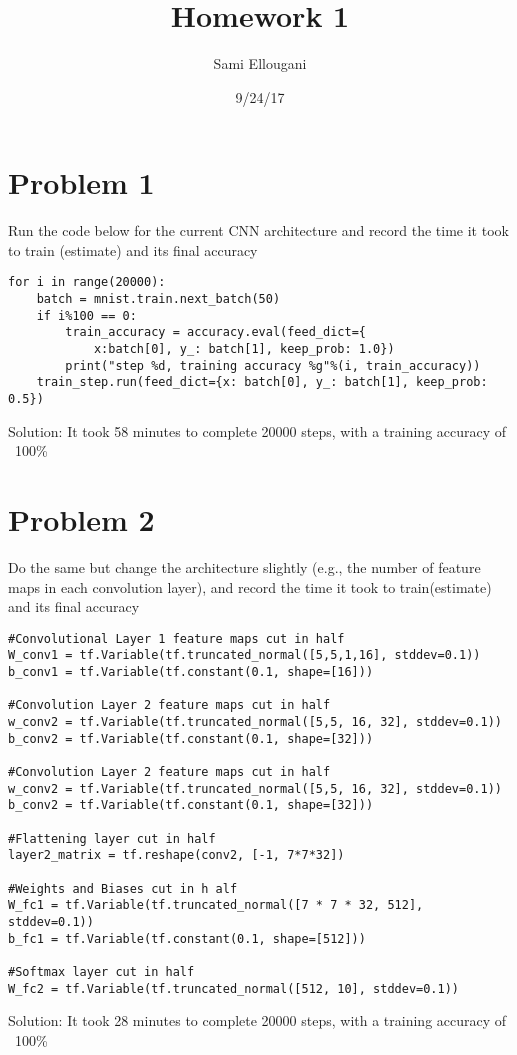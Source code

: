 \documentclass[a4paper]{article}
\title{Homework 1}
\author{Sami Ellougani}
\date{9/24/17}
\begin{document}
\lstset{language=Python}

\maketitle

\section{Problem 1}
Run the code below for the current CNN architecture and record the time it took to train (estimate) and its final accuracy
\begin{lstlisting}[frame=single]
for i in range(20000):
    batch = mnist.train.next_batch(50)
    if i%100 == 0:
        train_accuracy = accuracy.eval(feed_dict={
            x:batch[0], y_: batch[1], keep_prob: 1.0})
        print("step %d, training accuracy %g"%(i, train_accuracy))
    train_step.run(feed_dict={x: batch[0], y_: batch[1], keep_prob: 0.5})
\end{lstlisting}
Solution: It took 58 minutes to complete 20000 steps, with a training accuracy of ~100\%

\section{Problem 2}
Do the same but change the architecture slightly (e.g., the number of feature maps in each convolution layer), and record the time it took to train(estimate) and its final accuracy
\begin{lstlisting}[frame=single]
#Convolutional Layer 1 feature maps cut in half
W_conv1 = tf.Variable(tf.truncated_normal([5,5,1,16], stddev=0.1))
b_conv1 = tf.Variable(tf.constant(0.1, shape=[16])) 

#Convolution Layer 2 feature maps cut in half
w_conv2 = tf.Variable(tf.truncated_normal([5,5, 16, 32], stddev=0.1))
b_conv2 = tf.Variable(tf.constant(0.1, shape=[32]))

#Convolution Layer 2 feature maps cut in half
w_conv2 = tf.Variable(tf.truncated_normal([5,5, 16, 32], stddev=0.1))
b_conv2 = tf.Variable(tf.constant(0.1, shape=[32]))

#Flattening layer cut in half
layer2_matrix = tf.reshape(conv2, [-1, 7*7*32])

#Weights and Biases cut in h alf
W_fc1 = tf.Variable(tf.truncated_normal([7 * 7 * 32, 512], stddev=0.1))
b_fc1 = tf.Variable(tf.constant(0.1, shape=[512]))

#Softmax layer cut in half
W_fc2 = tf.Variable(tf.truncated_normal([512, 10], stddev=0.1))
\end{lstlisting}
Solution: It took 28 minutes to complete 20000 steps, with a training accuracy of ~100\%
\end{document}
